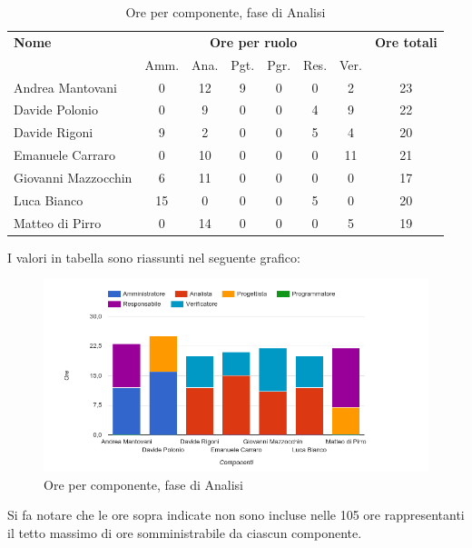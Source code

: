 \begin{table}[H]
\begin{tabular}{lccccccc}
\toprule
    \textbf{Nome}  & \multicolumn{6}{c}{\textbf{Ore per ruolo}} & \textbf{Ore totali} \\
     & Amm. & Ana. & Pgt. & Pgr. & Res. & Ver. & \\
    \midrule
    
	Andrea Mantovani & 0 & 12 & 9 & 0 & 0 & 2 & 23 \\
	Davide Polonio & 0 & 9 & 0 & 0 & 4 & 9 & 22 \\
	Davide Rigoni & 9 & 2 & 0 & 0 & 5 & 4 & 20 \\
	Emanuele Carraro & 0 & 10 & 0 & 0 & 0 & 11 & 21 \\
	Giovanni Mazzocchin & 6 & 11 & 0 & 0 & 0 & 0 & 17 \\
	Luca Bianco & 15 & 0 & 0 & 0 & 5 & 0 & 20 \\
	Matteo di Pirro & 0 & 14 & 0 & 0 & 0 & 5 & 19 \\
    
    \bottomrule
\end{tabular}
\caption{Ore per componente, fase di Analisi}
\end{table}

I valori in tabella sono riassunti nel seguente grafico: \\ 

    \begin{figure}[H]
      \begin{center}
        \includegraphics[width=12cm]{res/img/orePerComponenteAnalisi.png}
      \caption{Ore per componente, fase di Analisi}
      \end{center} 
    \end{figure}    
    
Si fa notare che le ore sopra indicate non sono incluse nelle 105 ore rappresentanti il tetto massimo di ore somministrabile da ciascun componente.



